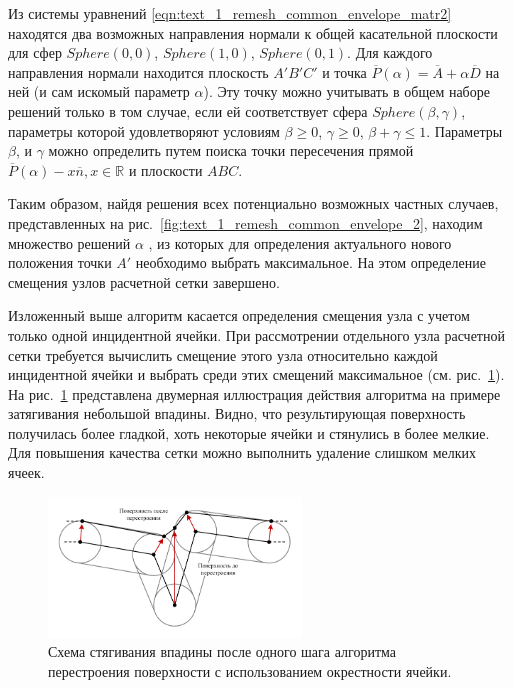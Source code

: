 Из системы уравнений \eqref{eqn:text_1_remesh_common_envelope_matr2} находятся два возможных направления нормали к общей касательной плоскости для сфер $Sphere(0,0)$, $Sphere(1,0)$, $Sphere(0,1)$.
Для каждого направления нормали находится плоскость $A'B'C'$ и точка $\overline{P}(\alpha) = \overline{A} + \alpha \overline{D}$ на ней (и сам искомый параметр $\alpha$).
Эту точку можно учитывать в общем наборе решений только в том случае, если ей соответствует сфера $Sphere(\beta, \gamma)$, параметры которой удовлетворяют условиям $\beta \ge 0$, $\gamma \ge 0$, $\beta + \gamma \le 1$.
Параметры $\beta$, и $\gamma$ можно определить путем поиска точки пересечения прямой $\overline{P}(\alpha) - x \overline{n}, x \in \mathbb{R}$ и плоскости $ABC$.

Таким образом, найдя решения всех потенциально возможных частных случаев, представленных на рис.~\ref{fig:text_1_remesh_common_envelope_2}, находим множество решений $\alpha$ , из которых для определения актуального нового положения точки $A'$ необходимо выбрать максимальное.
На этом определение смещения узлов расчетной сетки завершено.

Изложенный выше алгоритм касается определения смещения узла с учетом только одной инцидентной ячейки.
При рассмотрении отдельного узла расчетной сетки требуется вычислить смещение этого узла относительно каждой инцидентной ячейки и выбрать среди этих смещений максимальное (см. рис.~\ref{fig:text_1_remesh_common_envelope_4}).
На рис.~\ref{fig:text_1_remesh_common_envelope_4} представлена двумерная иллюстрация действия алгоритма на примере затягивания небольшой впадины.
Видно, что результирующая поверхность получилась более гладкой, хоть некоторые ячейки и стянулись в более мелкие.
Для повышения качества сетки можно выполнить удаление слишком мелких ячеек.

\begin{figure}[ht]
\centering
\includegraphics[width=0.6\textwidth]{./pics/text_1_remesh_common_envelope/out_from_cave.pdf}
\singlespacing
{}\caption{Схема стягивания впадины после одного шага алгоритма перестроения поверхности с использованием окрестности ячейки.}
\label{fig:text_1_remesh_common_envelope_4}
\end{figure}

